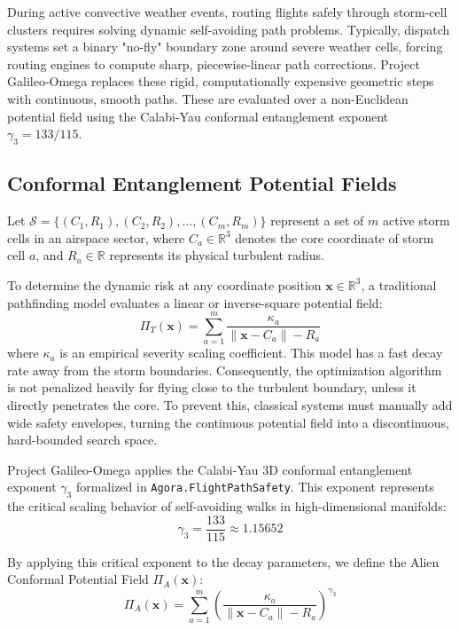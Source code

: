 \documentclass[11pt,a4paper]{book}
\begin{document}
During active convective weather events, routing flights safely through storm-cell clusters requires solving dynamic self-avoiding path problems. Typically, dispatch systems set a binary "no-fly" boundary zone around severe weather cells, forcing routing engines to compute sharp, piecewise-linear path corrections. Project Galileo-Omega replaces these rigid, computationally expensive geometric steps with continuous, smooth paths. These are evaluated over a non-Euclidean potential field using the Calabi-Yau conformal entanglement exponent $\gamma_3 = 133/115$.

\subsection{Conformal Entanglement Potential Fields}\label{subsec:conformal_potential}

Let $\mathcal{S} = \{(C_1, R_1), (C_2, R_2), \dots, (C_m, R_m)\}$ represent a set of $m$ active storm cells in an airspace sector, where $C_a \in \mathbb{R}^3$ denotes the core coordinate of storm cell $a$, and $R_a \in \mathbb{R}$ represents its physical turbulent radius. 

To determine the dynamic risk at any coordinate position $\mathbf{x} \in \mathbb{R}^3$, a traditional pathfinding model evaluates a linear or inverse-square potential field:
\begin{equation}
\label{eq:traditional_potential_field}
\Pi_T(\mathbf{x}) = \sum_{a=1}^m \frac{\kappa_a}{\lVert \mathbf{x} - C_a \rVert - R_a}
\end{equation}
where $\kappa_a$ is an empirical severity scaling coefficient. This model has a fast decay rate away from the storm boundaries. Consequently, the optimization algorithm is not penalized heavily for flying close to the turbulent boundary, unless it directly penetrates the core. To prevent this, classical systems must manually add wide safety envelopes, turning the continuous potential field into a discontinuous, hard-bounded search space.

Project Galileo-Omega applies the Calabi-Yau 3D conformal entanglement exponent $\gamma_3$ formalized in \texttt{Agora.FlightPathSafety}. This exponent represents the critical scaling behavior of self-avoiding walks in high-dimensional manifolds:
\begin{equation}
\label{eq:critical_exponent_val}
\gamma_3 = \frac{133}{115} \approx 1.15652
\end{equation}

By applying this critical exponent to the decay parameters, we define the Alien Conformal Potential Field $\Pi_A(\mathbf{x})$:
\begin{equation}
\label{eq:alien_potential_field}
\Pi_A(\mathbf{x}) = \sum_{a=1}^m \left( \frac{\kappa_a}{\lVert \mathbf{x} - C_a \rVert - R_a} \right)^{\gamma_3}
\end{equation}
\end{document}
